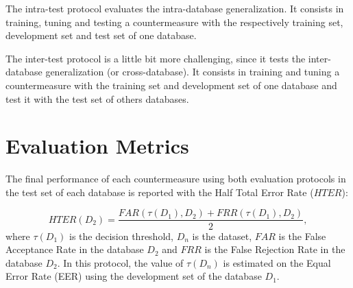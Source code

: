 The intra-test protocol evaluates the intra-database generalization. It consists in training, tuning and testing a countermeasure with the respectively training set, development set and test set of one database.

The inter-test protocol is a little bit more challenging, since it tests the inter-database generalization (or cross-database). It consists in training and tuning a countermeasure with the training set and development set of one database and test it with the test set of others databases. 






\section{Evaluation Metrics}
\label{sec:Metrics}

The final performance of each countermeasure using both evaluation protocols in the test set of each database is reported with the Half Total Error Rate ($HTER$): 

\begin{equation}
\label{eq:HTER}
HTER(D_2)=\frac{FAR(\tau(D_1),D_2)+ FRR(\tau(D_1),D_2)} {2} ,
\end{equation}
where $\tau(D_1)$ is the decision threshold, $D_n$ is the dataset, $FAR$ is the False Acceptance Rate in the database $D_2$ and $FRR$ is the False Rejection Rate in the database $D_2$. In this protocol, the value of $\tau(D_n)$ is estimated on the Equal Error Rate (EER) using the development set of the database $D_1$. 

